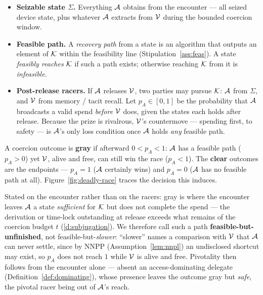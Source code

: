 \begin{definition}\label{def:racers}
\leavevmode
\begin{itemize}[nosep,leftmargin=1.4em]
  \item \textbf{Seizable state $\Sigma$.} Everything $\mathcal{A}$ obtains from the
        encounter --- all seized device state, plus whatever $\mathcal{A}$ extracts
        from $\mathcal{V}$ during the bounded coercion window.
  \item \textbf{Feasible path.} A \emph{recovery path} from a state is an
        algorithm that outputs an element of $\mathcal{K}$ within the feasibility line
        (Stipulation~\ref{ass:feas}). A state \emph{feasibly reaches} $\mathcal{K}$ if such a
        path exists; otherwise reaching $\mathcal{K}$ from it is \emph{infeasible}.
  \item \textbf{Post-release racers.} If $\mathcal{A}$ releases $\mathcal{V}$, two
        parties may pursue $\mathcal{K}$: $\mathcal{A}$ from $\Sigma$, and $\mathcal{V}$ from
        memory / tacit recall. Let $p_A \in [0,1]$ be the probability that
        $\mathcal{A}$ broadcasts a valid spend \emph{before} $\mathcal{V}$ does, given
        the states each holds after release. Because the prize is rivalrous,
        $\mathcal{V}$'s countermove --- spending first, to safety --- is
        $\mathcal{A}$'s only loss condition once $\mathcal{A}$ holds \emph{any}
        feasible path.
\end{itemize}
\end{definition}

\begin{definition}\label{def:gray}
A coercion outcome is \textbf{gray} if afterward $0 < p_A < 1$: $\mathcal{A}$ has a
feasible path ($p_A > 0$) yet $\mathcal{V}$, alive and free, can still win the race
($p_A < 1$). The \textbf{clear} outcomes are the endpoints --- $p_A = 1$
($\mathcal{A}$ certainly wins) and $p_A = 0$ ($\mathcal{A}$ has no feasible path at
all). Figure~\ref{fig:deadly-race} traces the decision this induces.

Stated on the encounter rather than on the racers: gray is where the encounter
leaves $\mathcal{A}$ a state \emph{sufficient} for $\mathcal{K}$ but does not complete the
spend --- the derivation or time-lock outstanding at release exceeds what remains
of the coercion budget $t$ (\ref{d:subjugation}). We therefore call such a path
\textbf{feasible-but-unfinished}, not feasible-but-\emph{slower}: ``slower'' names a
comparison with $\mathcal{V}$ that $\mathcal{A}$ can never settle, since by NNPP
(Assumption~\ref{lem:nnpl}) an undisclosed shortcut may exist, so $p_A$ does not
reach $1$ while $\mathcal{V}$ is alive and free. Pivotality then follows from the
encounter alone --- absent an access-dominating delegate
(Definition~\ref{def:dominating}), whose presence leaves the outcome gray but
\emph{safe}, the pivotal racer being out of $\mathcal{A}$'s reach.
\end{definition}

